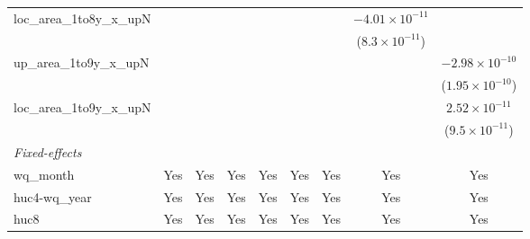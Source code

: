 \begin{tabular}{lcccccccc}
   loc\_area\_1to8y\_x\_upN     &                          &                          &                          &                          &                          &                          & $-4.01\times 10^{-11}$   &   \\   
                                &                          &                          &                          &                          &                          &                          & ($8.3\times 10^{-11}$)   &   \\   
   up\_area\_1to9y\_x\_upN      &                          &                          &                          &                          &                          &                          &                          & $-2.98\times 10^{-10}$\\    
                                &                          &                          &                          &                          &                          &                          &                          & ($1.95\times 10^{-10}$)\\    
   loc\_area\_1to9y\_x\_upN     &                          &                          &                          &                          &                          &                          &                          & $2.52\times 10^{-11}$\\    
                                &                          &                          &                          &                          &                          &                          &                          & ($9.5\times 10^{-11}$)\\    
   \midrule
   \emph{Fixed-effects}\\
   wq\_month                    & Yes                      & Yes                      & Yes                      & Yes                      & Yes                      & Yes                      & Yes                      & Yes\\  
   huc4-wq\_year                & Yes                      & Yes                      & Yes                      & Yes                      & Yes                      & Yes                      & Yes                      & Yes\\  
   huc8                         & Yes                      & Yes                      & Yes                      & Yes                      & Yes                      & Yes                      & Yes                      & Yes\\  

\end{tabular}
